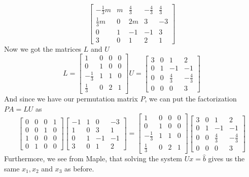 \documentclass[12pt]{article}
\begin{document}
$$
\begin{bmatrix}
-\frac{1}{3}m & m & \frac{4}{3} & -\frac{4}{3} & \frac{4}{3}\\
\frac{1}{3}m & 0 & 2m & 3 & -3\\
0 & 1 & -1 & -1 & 3\\
3 & 0 & 1 & 2 & 1
\end{bmatrix}
$$
Now we got the matrices $L$ and $U$
$$
L
=
\begin{bmatrix}
1 & 0 & 0 & 0\\
0 & 1 & 0 & 0 \\
-\frac{1}{3} & 1 & 1 & 0 \\
\frac{1}{3} & 0 & 2 & 1
\end{bmatrix}
U
=
\begin{bmatrix}
3 & 0 & 1 & 2\\
0 & 1 & -1 & -1 \\
0 & 0 & \frac{4}{3} & -\frac{4}{3} \\
0 & 0 & 0 & 3
\end{bmatrix}
$$
And since we have our permutation matrix $P$, we can put the factorization $PA=LU$ as
$$
\begin{bmatrix}
0 & 0 & 0 & 1\\
0 & 0 & 1 & 0 \\
1 & 0 & 0 & 0 \\
0 & 1 & 0 & 0
\end{bmatrix}
\begin{bmatrix}
-1 & 1 & 0 & -3\\
1 & 0 & 3 & 1 \\
0 & 1 & -1 & -1 \\
3 & 0 & 1 & 2
\end{bmatrix}
=
\begin{bmatrix}
1 & 0 & 0 & 0\\
0 & 1 & 0 & 0 \\
-\frac{1}{3} & 1 & 1 & 0 \\
\frac{1}{3} & 0 & 2 & 1
\end{bmatrix}
\begin{bmatrix}
3 & 0 & 1 & 2\\
0 & 1 & -1 & -1 \\
0 & 0 & \frac{4}{3} & -\frac{4}{3} \\
0 & 0 & 0 & 3
\end{bmatrix}
$$
Furthermore, we see from Maple, that solving the system $Ux=\hat{b}$ gives us the same $x_1,x_2$ and $x_3$ as before.
\end{document}
